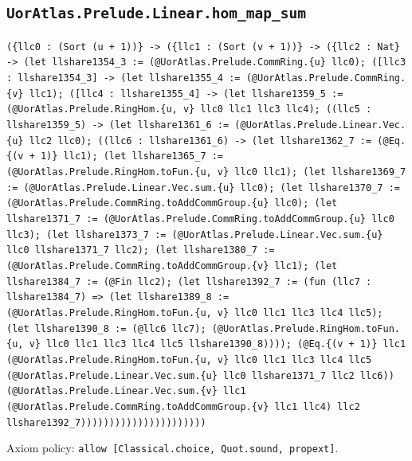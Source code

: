 \documentclass[11pt]{article}
\begin{document}
\subsection*{\texttt{UorAtlas.Prelude.Linear.hom\_map\_sum}}
\noindent\texttt{(\{llc0 : (Sort (u + 1))\} -> (\{llc1 : (Sort (v + 1))\} -> (\{llc2 : Nat\} -> (let llshare1354\_3 := (@UorAtlas.Prelude.CommRing.\{u\} llc0); ([llc3 : llshare1354\_3] -> (let llshare1355\_4 := (@UorAtlas.Prelude.CommRing.\{v\} llc1); ([llc4 : llshare1355\_4] -> (let llshare1359\_5 := (@UorAtlas.Prelude.RingHom.\{u, v\} llc0 llc1 llc3 llc4); ((llc5 : llshare1359\_5) -> (let llshare1361\_6 := (@UorAtlas.Prelude.Linear.Vec.\{u\} llc2 llc0); ((llc6 : llshare1361\_6) -> (let llshare1362\_7 := (@Eq.\{(v + 1)\} llc1); (let llshare1365\_7 := (@UorAtlas.Prelude.RingHom.toFun.\{u, v\} llc0 llc1); (let llshare1369\_7 := (@UorAtlas.Prelude.Linear.Vec.sum.\{u\} llc0); (let llshare1370\_7 := (@UorAtlas.Prelude.CommRing.toAddCommGroup.\{u\} llc0); (let llshare1371\_7 := (@UorAtlas.Prelude.CommRing.toAddCommGroup.\{u\} llc0 llc3); (let llshare1373\_7 := (@UorAtlas.Prelude.Linear.Vec.sum.\{u\} llc0 llshare1371\_7 llc2); (let llshare1380\_7 := (@UorAtlas.Prelude.CommRing.toAddCommGroup.\{v\} llc1); (let llshare1384\_7 := (@Fin llc2); (let llshare1392\_7 := (fun (llc7 : llshare1384\_7) => (let llshare1389\_8 := (@UorAtlas.Prelude.RingHom.toFun.\{u, v\} llc0 llc1 llc3 llc4 llc5); (let llshare1390\_8 := (@llc6 llc7); (@UorAtlas.Prelude.RingHom.toFun.\{u, v\} llc0 llc1 llc3 llc4 llc5 llshare1390\_8)))); (@Eq.\{(v + 1)\} llc1 (@UorAtlas.Prelude.RingHom.toFun.\{u, v\} llc0 llc1 llc3 llc4 llc5 (@UorAtlas.Prelude.Linear.Vec.sum.\{u\} llc0 llshare1371\_7 llc2 llc6)) (@UorAtlas.Prelude.Linear.Vec.sum.\{v\} llc1 (@UorAtlas.Prelude.CommRing.toAddCommGroup.\{v\} llc1 llc4) llc2 llshare1392\_7))))))))))))))))))))))}\par
\noindent Axiom policy: \texttt{allow [Classical.choice, Quot.sound, propext]}.\par
\end{document}
